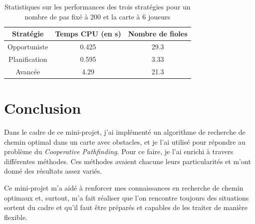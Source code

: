\documentclass[letterpaper]{article}
\begin{document}
\begin{table}
    \centering
    \begin{tabular}{|c|c|c|}
	\hline Strat\'egie & Temps CPU (en \si{s}) & Nombre de fioles \\ 
    \hline Opportuniste & 0.425 & 29.3 \\ 
	\hline Planification & 0.595 & 3.33 \\ 
	\hline Avanc\'ee & 4.29 & 21.3 \\ 
	\hline
	\end{tabular}
	\caption{Statistiques sur les performances des trois strat\'egies pour un nombre de pas fix\'e \`a 200 et la carte \`a 6 joueurs}
  \label{tab:stats}
\end{table}

\section{Conclusion}
Dans le cadre de ce mini-projet, j'ai impl\'ement\'e un algorithme de recherche de chemin optimal dans un carte avec obstacles, et je l'ai utilis\'e pour r\'epondre au probl\`eme du \textit{Cooperative Pathfinding}.
Pour ce faire, je l'ai enrichi \`a travers diff\'erentes m\'ethodes.
Ces m\'ethodes avaient chacune leurs particularit\'es et m'ont donn\'e des r\'esultats assez vari\'es.

Ce mini-projet m'a aid\'e \`a renforcer mes connaissances en recherche de chemin optimaux et, surtout, m'a fait r\'ealiser que l'on rencontre toujours des situations sortent du cadre et qu'il faut \^etre pr\'epar\'es et capables de les traiter de mani\`ere flexible.
\end{document}
